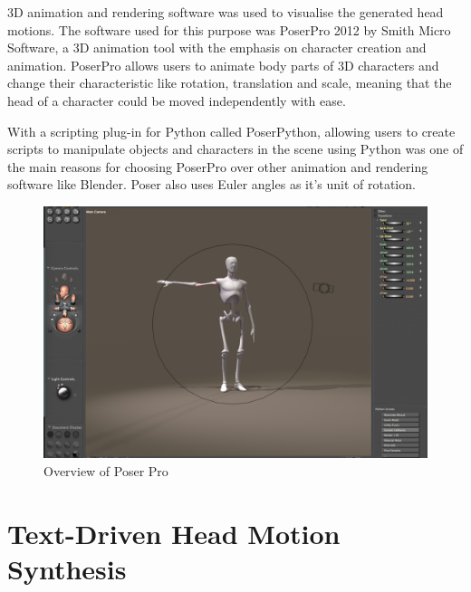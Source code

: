 \documentclass[bsc,frontabs,twoside,singlespacing,parskip]{infthesis}
\begin{document}
3D animation and rendering software was used to visualise the generated head motions. The software used for this purpose was PoserPro 2012 by Smith Micro Software, a 3D animation tool with the emphasis on character creation and animation. PoserPro allows users to animate body parts of 3D characters and change their characteristic like rotation, translation and scale, meaning that the head of a character could be moved independently with ease.

With a scripting plug-in for Python called PoserPython, \cite{poser_python} allowing users to create scripts to manipulate objects and characters in the scene using Python was one of the main reasons for choosing PoserPro over other animation and rendering software like Blender. Poser also uses Euler angles as it's unit of rotation.


\begin{figure}
	\centering
		\includegraphics[width=1.0\textwidth]{poser.png}
		\caption{Overview of Poser Pro}
\end{figure}

\chapter{Text-Driven Head Motion Synthesis}

\end{document}
